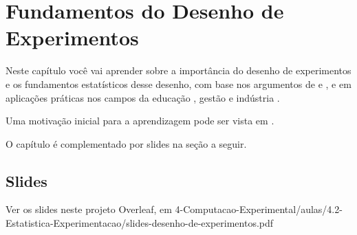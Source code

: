 \chapter{Fundamentos do Desenho de Experimentos}

Neste capítulo você vai aprender sobre a importância do desenho de experimentos e os fundamentos estatísticos desse desenho, com base nos argumentos de \citet{barton_graphical_1999} e \citet{dean_design_1999}, e em aplicações práticas nos campos da educação \citep{schneider_estimating_2007}, gestão \citep{condra_value-added_1995} e indústria \citet{barton_graphical_1999}.

Uma motivação inicial para a aprendizagem pode ser vista em \citet{simple_learning_pro_types_2015}.

O capítulo é complementado por slides na seção a seguir.

\section{Slides}
Ver os slides neste projeto Overleaf, em
4-Computacao-Experimental/aulas/4.2-Estatistica-Experimentacao/slides-desenho-de-experimentos.pdf
%
